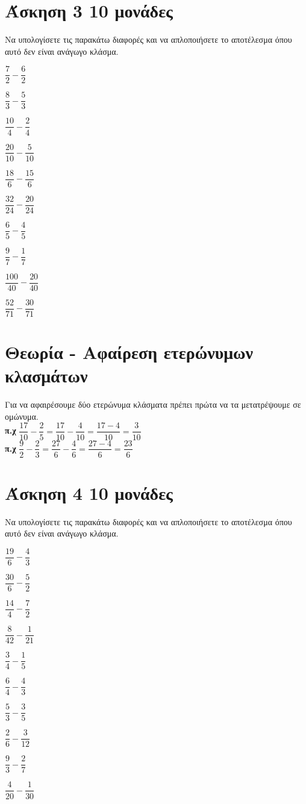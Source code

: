 \documentclass[a4paper,10pt]{report}
\begin{document}
\section*{Άσκηση 3  \hfill \small{10 μονάδες}}
Να υπολογίσετε τις παρακάτω διαφορές  και να απλοποιήσετε το αποτέλεσμα όπου αυτό δεν είναι  ανάγωγο κλάσμα.
\begin{enumerate}[1)]
\begin{multicols}{2}
 \item $\dfrac{7}{2}-\dfrac{6}{2}$
 \item $\dfrac{8}{3}-\dfrac{5}{3}$
 \item $\dfrac{10}{4}-\dfrac{2}{4}$
 \item $\dfrac{20}{10}-\dfrac{5}{10}$
 \item $\dfrac{18}{6}-\dfrac{15}{6}$
 \item $\dfrac{32}{24}-\dfrac{20}{24}$
 \item $\dfrac{6}{5}-\dfrac{4}{5}$
 \item $\dfrac{9}{7}-\dfrac{1}{7}$
 \item $\dfrac{100}{40}-\dfrac{20}{40}$
 \item $\dfrac{52}{71}-\dfrac{30}{71}$
\end{multicols}
\end{enumerate}


\section*{Θεωρία - Αφαίρεση ετερώνυμων κλασμάτων\hfill \small{}}
Για να αφαιρέσουμε δύο ετερώνυμα κλάσματα πρέπει πρώτα να τα μετατρέψουμε σε ομώνυμα. \\
\textbf{π.χ} $\dfrac{17}{10}-\dfrac{2}{5}=\dfrac{17}{10}-\dfrac{4}{10}=\dfrac{17-4}{10}=\dfrac{3}{10}$\\
\textbf{π.χ} $\dfrac{9}{2}-\dfrac{2}{3}=\dfrac{27}{6}-\dfrac{4}{6}=\dfrac{27-4}{6}=\dfrac{23}{6}$



\section*{Άσκηση 4  \hfill \small{10 μονάδες}}
Να υπολογίσετε τις παρακάτω διαφορές  και να απλοποιήσετε το αποτέλεσμα όπου αυτό δεν είναι  ανάγωγο κλάσμα.
\begin{enumerate}[1)]
\begin{multicols}{2}
 \item $\dfrac{19}{6}-\dfrac{4}{3}$
 \item $\dfrac{30}{6}-\dfrac{5}{2}$
 \item $\dfrac{14}{4}-\dfrac{7}{2}$
 \item $\dfrac{8}{42}-\dfrac{1}{21}$
 \item $\dfrac{3}{4}-\dfrac{1}{5}$
 \item $\dfrac{6}{4}-\dfrac{4}{3}$
 \item $\dfrac{5}{3}-\dfrac{3}{5}$
 \item $\dfrac{2}{6}-\dfrac{3}{12}$
 \item $\dfrac{9}{3}-\dfrac{2}{7}$
 \item $\dfrac{4}{20}-\dfrac{1}{30}$
\end{multicols}
\end{enumerate}
\end{document}

